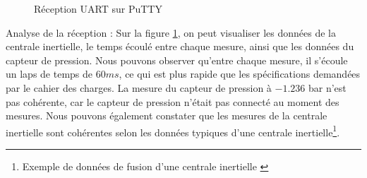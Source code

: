{	\begin{figure}[h]
		\centering
		\caption{Réception UART sur PuTTY}
		\label{fig:puttytrames}
	\end{figure}
	Analyse de la réception : Sur la figure \ref{fig:puttytrames}, on peut visualiser les données de la centrale inertielle, le temps écoulé entre chaque mesure, ainsi que les données du capteur de pression. Nous pouvons observer qu'entre chaque mesure, il s'écoule un laps de temps de $60 ms$, ce qui est plus rapide que les spécifications demandées par le cahier des charges. La mesure du capteur de pression à $-1.236$ bar n'est pas cohérente, car le capteur de pression n'était pas connecté au moment des mesures. Nous pouvons également constater que les mesures de la centrale inertielle sont cohérentes selon les données typiques d'une centrale inertielle\footnote{Exemple de données de fusion d'une centrale inertielle \cite{rozbicka2021estimation}}.
	
	\clearpage
}

